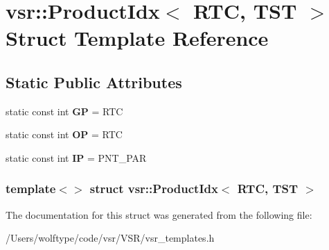 \hypertarget{structvsr_1_1_product_idx_3_01_r_t_c_00_01_t_s_t_01_4}{\section{vsr\-:\-:Product\-Idx$<$ R\-T\-C, T\-S\-T $>$ Struct Template Reference}
\label{structvsr_1_1_product_idx_3_01_r_t_c_00_01_t_s_t_01_4}
}
\subsection*{Static Public Attributes}
\begin{DoxyCompactItemize}
\item 
\hypertarget{structvsr_1_1_product_idx_3_01_r_t_c_00_01_t_s_t_01_4_ae668f5c8e296d05eef1eaaf1a892e42b}{static const int {\bfseries G\-P} = R\-T\-C}\label{structvsr_1_1_product_idx_3_01_r_t_c_00_01_t_s_t_01_4_ae668f5c8e296d05eef1eaaf1a892e42b}

\item 
\hypertarget{structvsr_1_1_product_idx_3_01_r_t_c_00_01_t_s_t_01_4_a8475f2d1c65845f1c7323eafb61942e5}{static const int {\bfseries O\-P} = R\-T\-C}\label{structvsr_1_1_product_idx_3_01_r_t_c_00_01_t_s_t_01_4_a8475f2d1c65845f1c7323eafb61942e5}

\item 
\hypertarget{structvsr_1_1_product_idx_3_01_r_t_c_00_01_t_s_t_01_4_aa1aef41df67106ddd922903f4d7dc891}{static const int {\bfseries I\-P} = P\-N\-T\-\_\-\-P\-A\-R}\label{structvsr_1_1_product_idx_3_01_r_t_c_00_01_t_s_t_01_4_aa1aef41df67106ddd922903f4d7dc891}

\end{DoxyCompactItemize}
\subsubsection*{template$<$$>$ struct vsr\-::\-Product\-Idx$<$ R\-T\-C, T\-S\-T $>$}



The documentation for this struct was generated from the following file\-:\begin{DoxyCompactItemize}
\item 
/\-Users/wolftype/code/vsr/\-V\-S\-R/vsr\-\_\-templates.\-h\end{DoxyCompactItemize}
